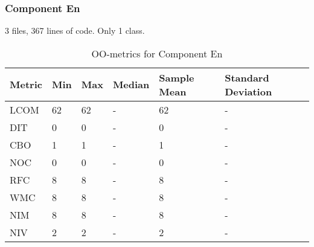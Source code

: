 \subsubsection{Component En}
3 files, 367 lines of code. Only 1 class.
\begin{table}[]
\centering
\caption{OO-metrics for Component En}
\label{tab:oometrics-en}
\begin{tabular}{|l|l|l|l|l|l|}
\hline
\textbf{Metric} & \textbf{Min} & \textbf{Max} & \textbf{Median} & \textbf{Sample Mean} & \textbf{Standard Deviation} \\ \hline
LCOM            & 62           & 62           & -               & 62                   & -                           \\ \hline
DIT             & 0            & 0            & -               & 0                    & -                           \\ \hline
CBO             & 1            & 1            & -               & 1                    & -                           \\ \hline
NOC             & 0            & 0            & -               & 0                    & -                           \\ \hline
RFC             & 8            & 8            & -               & 8                    & -                           \\ \hline
WMC             & 8            & 8            & -               & 8                    & -                           \\ \hline
NIM             & 8            & 8            & -               & 8                    & -                           \\ \hline
NIV             & 2            & 2            & -               & 2                    & -                           \\ \hline
\end{tabular}
\end{table}




